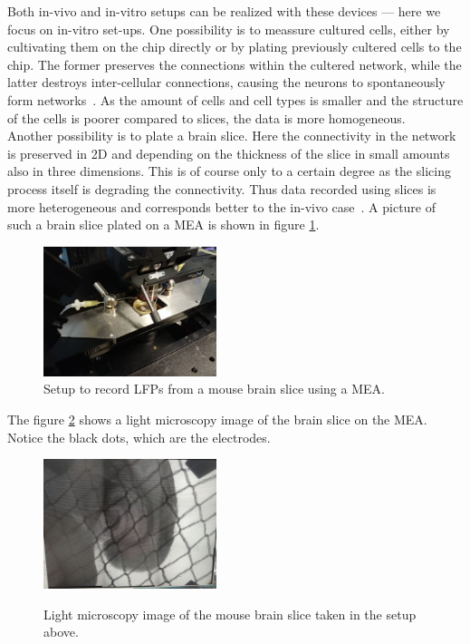 \documentclass[11pt, twocolumn]{article}
\begin{document}
        Both in-vivo and in-vitro setups can be realized with these devices --- here we focus on in-vitro set-ups.
        One possibility is to meassure cultured cells, either by cultivating them on the chip directly or by plating previously cultered cells to the chip.
        The former preserves the connections within the cultered network, while the latter destroys inter-cellular connections, causing the neurons to spontaneously form networks~\autocite{POTTER200117, gross2006emerging, POTTER200149}.
        As the amount of cells and cell types is smaller and the structure of the cells is poorer compared to slices, the data is more homogeneous. \\
        Another possibility is to plate a brain slice.
        Here the connectivity in the network is preserved in 2D and depending on the thickness of the slice in small amounts also in three dimensions. This is of course only to a certain degree as the slicing process itself is degrading the connectivity.
        Thus data recorded using slices is more heterogeneous and corresponds better to the in-vivo case~\autocite{soussou2006mapping, gross2006emerging}.
        A picture of such a brain slice plated on a MEA is shown in figure \ref{setup}.
        \begin{figure}
         \begin{center}
          \includegraphics[keepaspectratio, width = 0.45\textwidth]{img/1_setup_close.jpg}
         \end{center}
        \caption{Setup to record LFPs from a mouse brain slice using a MEA.}\label{setup}
        \end{figure}

        The figure \ref{slice} shows a light microscopy image of the brain slice on the MEA.
        Notice the black dots, which are the electrodes.
        \begin{figure}
         \begin{center}
          \includegraphics[keepaspectratio, width = 0.45\textwidth]{img/1_setup_slice_.jpg} \\
         \end{center}
        \caption{Light microscopy image of the mouse brain slice taken in the setup above.}\label{slice}
        \end{figure}
\end{document}
